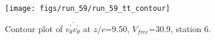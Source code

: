 \begin{figure}[H]
\centering
\texttt{[image: figs/run\_59/run\_59\_tt\_contour]}
\caption{Contour plot of $\overline{v_{\theta}^{\prime} v_{\theta}^{\prime}}$ at $z/c$=9.50, $V_{free}$=30.9, station 6.}
\label{fig:run_59_tt_contour}
\end{figure}


